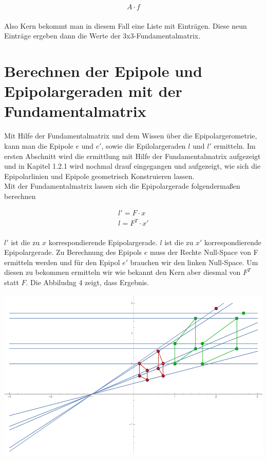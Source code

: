\begin{gather}
A\cdot f 
\end{gather} \\

Also Kern bekommt man in diesem Fall eine Liste mit Einträgen. 
Diese neun Einträge ergeben dann die Werte der 3x3-Fundamentalmatrix. 


\section{Berechnen der Epipole und Epipolargeraden mit der Fundamentalmatrix}
	Mit Hilfe der Fundamentalmatrix und dem Wissen über die Epipolargerometrie, kann man die Epipole \ensuremath{e} und \ensuremath{e'}, sowie die Epilolargeraden \ensuremath{l} und \ensuremath{l'} ermitteln. Im ersten Abschnitt wird die ermittlung mit Hilfe der Fundamentalmatrix aufgezeigt und in Kapitel 1.2.1 wird nochmal drauf eingegangen und aufgezeigt, wie sich die Epipolarlinien und Epipole geometrisch Konstruieren lassen.\\

Mit der Fundamentalmatrix lassen sich die Epipolargerade folgendermaßen berechnen

\begin{gather}
l' = F \cdot x\\
l = F^T \cdot x'
\end{gather}\\

\ensuremath{l'} ist die zu \ensuremath{x} korrespondierende Epipolargerade. \ensuremath{l} ist die zu \ensuremath{x'} korrespondierende Epipolargerade. Zu Berechnung des Epipols \ensuremath{e} muss der Rechte Null-Space von F ermitteln werden und für den Epipol \ensuremath{e'} brauchen wir den linken Null-Space. Um diesen zu bekommen ermitteln wir wie bekannt den Kern aber diesmal von \ensuremath{F^T} statt \ensuremath{F}. Die Abbiludng 4 zeigt, dass Ergebnis.

\begin{minipage}{\linewidth}
	\centering
	\includegraphics[width=1.\linewidth]{images/Epipole_Epipollinien.png}
\end{minipage}\\ \\

